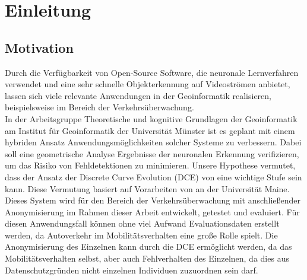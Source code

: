 \chapter{Einleitung}
\label{ch:intro}



\section{Motivation}{ 
	
Durch die Verfügbarkeit von Open-Source Software, die neuronale Lernverfahren verwendet und eine sehr schnelle Objekterkennung auf Videoströmen anbietet, lassen sich viele relevante Anwendungen in der Geoinformatik realisieren, beispielsweise im Bereich der Verkehrsüberwachung. \\
In der Arbeitsgruppe \glqq Theoretische und kognitive Grundlagen der Geoinformatik \grqq{} am Institut für Geoinformatik der Universität Münster ist es geplant mit einem hybriden Ansatz Anwendungsmöglichkeiten solcher Systeme zu verbessern. Dabei soll eine geometrische Analyse Ergebnisse der neuronalen Erkennung verifizieren, um das Risiko von Fehldetektionen zu minimieren. Unsere Hypothese vermutet, dass der Ansatz der Discrete Curve Evolution (DCE) von \citet{Latecki1999a}  eine wichtige Stufe sein kann. Diese Vermutung basiert auf Vorarbeiten von \citet*{Dorr2015} an der Universität Maine.\\

Dieses System wird für den Bereich der Verkehrsüberwachung mit anschließender Anonymisierung im Rahmen dieser Arbeit entwickelt, getestet und evaluiert. Für diesen Anwendungsfall können ohne viel Aufwand Evaluationsdaten erstellt werden, da Autoverkehr im Mobilitätsverhalten eine große Rolle spielt. Die Anonymisierung des Einzelnen kann durch die DCE ermöglicht werden, da das Mobilitätsverhalten selbst, aber auch Fehlverhalten des Einzelnen, da dies aus Datenschutzgründen nicht einzelnen Individuen zuzuordnen sein darf.
}



